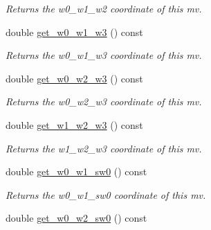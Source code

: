 \begin{DoxyCompactItemize}
\begin{DoxyCompactList}\small\item\em Returns the w0\-\_\-w1\-\_\-w2 coordinate of this mv. \end{DoxyCompactList}\item 
\hypertarget{classe3ga_1_1mv_ac48ba4522ff9c9af25a4b020842edc3c}{double \hyperlink{classe3ga_1_1mv_ac48ba4522ff9c9af25a4b020842edc3c}{get\-\_\-w0\-\_\-w1\-\_\-w3} () const }\label{classe3ga_1_1mv_ac48ba4522ff9c9af25a4b020842edc3c}

\begin{DoxyCompactList}\small\item\em Returns the w0\-\_\-w1\-\_\-w3 coordinate of this mv. \end{DoxyCompactList}\item 
\hypertarget{classe3ga_1_1mv_a2d11a47c91864fa1a9d980ee0ec7b238}{double \hyperlink{classe3ga_1_1mv_a2d11a47c91864fa1a9d980ee0ec7b238}{get\-\_\-w0\-\_\-w2\-\_\-w3} () const }\label{classe3ga_1_1mv_a2d11a47c91864fa1a9d980ee0ec7b238}

\begin{DoxyCompactList}\small\item\em Returns the w0\-\_\-w2\-\_\-w3 coordinate of this mv. \end{DoxyCompactList}\item 
\hypertarget{classe3ga_1_1mv_a1342796dc4427ce7c936131ebe092505}{double \hyperlink{classe3ga_1_1mv_a1342796dc4427ce7c936131ebe092505}{get\-\_\-w1\-\_\-w2\-\_\-w3} () const }\label{classe3ga_1_1mv_a1342796dc4427ce7c936131ebe092505}

\begin{DoxyCompactList}\small\item\em Returns the w1\-\_\-w2\-\_\-w3 coordinate of this mv. \end{DoxyCompactList}\item 
\hypertarget{classe3ga_1_1mv_ad4f3c1d5eadaae6e6c7f2e434058f47f}{double \hyperlink{classe3ga_1_1mv_ad4f3c1d5eadaae6e6c7f2e434058f47f}{get\-\_\-w0\-\_\-w1\-\_\-sw0} () const }\label{classe3ga_1_1mv_ad4f3c1d5eadaae6e6c7f2e434058f47f}

\begin{DoxyCompactList}\small\item\em Returns the w0\-\_\-w1\-\_\-sw0 coordinate of this mv. \end{DoxyCompactList}\item 
\hypertarget{classe3ga_1_1mv_a6e5816f905d9926cefebcfb40e4b8720}{double \hyperlink{classe3ga_1_1mv_a6e5816f905d9926cefebcfb40e4b8720}{get\-\_\-w0\-\_\-w2\-\_\-sw0} () const }\label{classe3ga_1_1mv_a6e5816f905d9926cefebcfb40e4b8720}


\end{DoxyCompactItemize}
